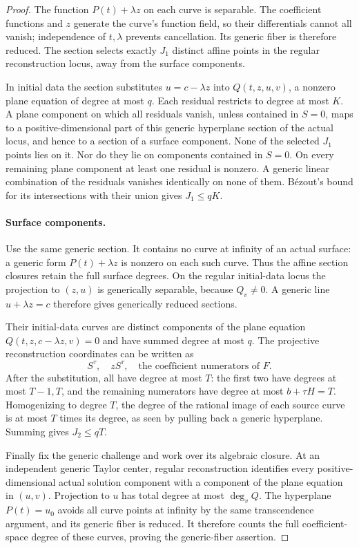 \begin{proof}
The function $P(t)+\lambda z$ on each curve is separable. The
coefficient functions and $z$ generate the curve's function field,
so their differentials cannot all vanish; independence of $t,\lambda$
prevents cancellation. Its generic fiber is therefore reduced.
The section selects exactly $J_1$ distinct affine points in the
regular reconstruction locus, away from the surface components.

In initial data the section substitutes $u=c-\lambda z$ into
$Q(t,z,u,v)$, a nonzero plane equation of degree at most $q$.
Each residual restricts to degree at most $K$. A plane component
on which all residuals vanish, unless contained in $S=0$, maps to
a positive-dimensional part of this generic hyperplane section of
the actual locus, and hence to a section of a surface component.
None of the selected $J_1$ points lies on it. Nor do they lie on
components contained in $S=0$. On every remaining plane component
at least one residual is nonzero. A generic linear combination of
the residuals vanishes identically on none of them. B\'ezout's bound
for its intersections with their union gives $J_1\le qK$.

\paragraph{Surface components.}
Use the same generic section. It contains no curve at infinity of
an actual surface: a generic form $P(t)+\lambda z$ is nonzero on
each such curve. Thus the affine section closures retain the full
surface degrees. On the regular initial-data locus the projection
to $(z,u)$ is generically separable, because $Q_v\ne0$. A generic
line $u+\lambda z=c$ therefore gives generically reduced sections.

Their initial-data curves are distinct components of the plane
equation $Q(t,z,c-\lambda z,v)=0$ and have summed degree at most $q$.
The projective reconstruction coordinates can be written as
\[
 S^\tau,\quad zS^\tau,\quad\text{the coefficient numerators of }F.
\]
After the substitution, all have degree at most $T$: the first two
have degrees at most $T-1,T$, and the remaining numerators have
degree at most $b+\tau H=T$. Homogenizing to degree $T$, the
degree of the rational image of each source curve is at most $T$
times its degree, as seen by pulling back a generic hyperplane.
Summing gives $J_2\le qT$.

Finally fix the generic challenge and work over its algebraic
closure. At an independent generic Taylor center, regular
reconstruction identifies every positive-dimensional actual
solution component with a component of the plane equation in
$(u,v)$. Projection to $u$ has total degree at most $\deg_v Q$.
The hyperplane $P(t)=u_0$ avoids all curve points at infinity by
the same transcendence argument, and its generic fiber is reduced.
It therefore counts the full coefficient-space degree of these
curves, proving the generic-fiber assertion.
\end{proof}


